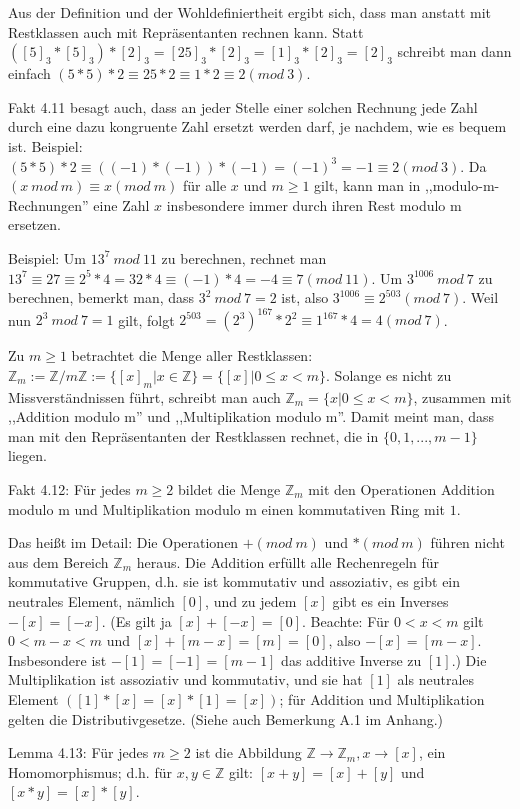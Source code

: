 \documentclass[a4paper]{article}
\begin{document}
\begin{multicols}{3}
    Aus der Definition und der Wohldefiniertheit ergibt sich, dass man anstatt mit Restklassen auch mit Repräsentanten rechnen kann. Statt $([5]_3 *[5]_3)*[2]_3 = [25]_3 *[2]_3 = [1]_3 *[2]_3 = [2]_3$ schreibt man dann einfach $(5*5)* 2 \equiv  25 * 2 \equiv  1 * 2 \equiv 2 (mod\ 3)$.

    Fakt 4.11 besagt auch, dass an jeder Stelle einer solchen Rechnung jede Zahl durch eine dazu kongruente Zahl ersetzt werden darf, je nachdem, wie es bequem ist. Beispiel: $(5*5)* 2 \equiv((-1)*(-1))*(-1) = (-1)^3 =- 1 \equiv 2 (mod\ 3)$. Da $(x\ mod\ m)\equiv x(mod\ m)$ für alle $x$ und $m\geq 1$ gilt, kann man in ,,modulo-m-Rechnungen'' eine Zahl $x$ insbesondere immer durch ihren Rest modulo m ersetzen.

    Beispiel: Um $13^7\ mod\ 11$ zu berechnen, rechnet man $13^7\equiv 27\equiv 2^5*4 =32* 4\equiv (-1)*4 = -4\equiv 7(mod\ 11)$. Um $3^{1006}\ mod\ 7$ zu berechnen, bemerkt man, dass $3^2\ mod\ 7=2$ ist, also $3^{1006}\equiv 2^{503}(mod\ 7)$. Weil nun $2^3\ mod\ 7=1$ gilt, folgt $2^{503}=(2^3)^{167} * 2^2 \equiv  1^{167}*4=4(mod\ 7)$.

    Zu $m\geq 1$ betrachtet die Menge aller Restklassen: $\mathbb{Z}_m:=\mathbb{Z}/m\mathbb{Z}:=\{[x]_m|x\in\mathbb{Z}\}=\{[x]| 0 \leq x<m\}$. Solange es nicht zu Missverständnissen führt, schreibt man auch $\mathbb{Z}_m=\{x|0 \leq x < m\}$, zusammen mit ,,Addition modulo m'' und ,,Multiplikation modulo m''. Damit meint man, dass man mit den Repräsentanten der Restklassen rechnet, die in $\{0,1 ,...,m-1\}$ liegen.

    Fakt 4.12: Für jedes $m\geq 2$ bildet die Menge $\mathbb{Z}_m$ mit den Operationen Addition modulo m und Multiplikation modulo m einen kommutativen Ring mit $1$.

    Das heißt im Detail: Die Operationen $+(mod\ m)$ und $*(mod\ m)$ führen nicht aus dem Bereich $\mathbb{Z}_m$ heraus. Die Addition erfüllt alle Rechenregeln für kommutative Gruppen, d.h. sie ist kommutativ und assoziativ, es gibt ein neutrales Element, nämlich $[0]$, und zu jedem $[x]$ gibt es ein Inverses $-[x]=[-x]$. (Es gilt ja $[x] + [-x] = [0]$. Beachte: Für $0 < x < m$ gilt $0< m-x < m$ und $[x]+[m-x]=[m]=[0]$, also $-[x]=[m-x]$. Insbesondere ist $-[1]=[-1]=[m-1]$ das additive Inverse zu $[1]$.) Die Multiplikation ist assoziativ und kommutativ, und sie hat $[1]$ als neutrales Element $([1]*[x] = [x]*[1] = [x])$; für Addition und Multiplikation gelten die Distributivgesetze. (Siehe auch Bemerkung A.1 im Anhang.)

    Lemma 4.13: Für jedes $m\geq 2$ ist die Abbildung $\mathbb{Z}\rightarrow\mathbb{Z}_m ,x\rightarrow [x]$, ein Homomorphismus; d.h. für $x,y\in\mathbb{Z}$ gilt: $[x+y]=[x]+[y]$ und $[x*y] = [x]*[y]$.


\end{multicols}
\end{document}
